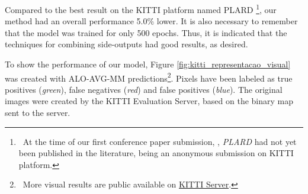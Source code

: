 

Compared to the best result on the KITTI platform named PLARD \cite{Chen:2019}\footnote{~At the time of our first conference paper submission, \cite{Reis:2019}, \textit{PLARD} had not yet been published in the literature, being an anonymous submission on KITTI platform.}, our method had an overall performance 5.0\% lower.
It is also necessary to remember that the model was trained for only 500 epochs.
Thus, it is indicated that the techniques for combining side-outputs had good results, as desired.

To show the performance of our model, Figure \ref{fig:kitti_representacao_visual} was created with ALO-AVG-MM predictions\footnote{~More visual results are public available on \href{http://www.cvlibs.net/datasets/kitti/eval_road_detail.php?result=a5ca173550cb383caf3e12ca236d7c809489d2d9}{KITTI Server}.}.
Pixels have been labeled as true positives (\textit{green}), false negatives (\textit{red}) and false positives (\textit{blue}).
The original images were created by the KITTI Evaluation Server, based on the binary map sent to the server.


